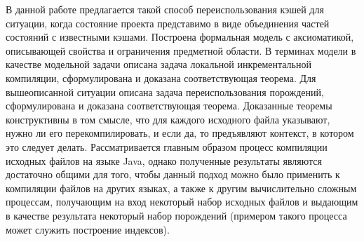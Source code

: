 В данной работе предлагается такой способ переиспользования кэшей для ситуации, когда состояние проекта представимо в виде объединения частей состояний с известными кэшами. Построена формальная модель с аксиоматикой, описывающей свойства и ограничения предметной области. В терминах модели в качестве модельной задачи описана задача локальной инкрементальной компиляции, сформулирована и доказана соответствующая теорема. Для вышеописанной ситуации описана задача переиспользования порождений, сформулирована и доказана соответствующая теорема. Доказанные теоремы конструктивны в том смысле, что для каждого исходного файла указывают, нужно ли его перекомпилировать, и если да, то предъявляют контекст, в котором это следует делать. Рассматривается главным образом процесс компиляции исходных файлов на языке Java, однако полученные результаты являются достаточно общими для того, чтобы данный подход можно было применить к компиляции файлов на других языках, а также к другим вычислительно сложным процессам, получающим на вход некоторый набор исходных файлов и выдающим в качестве результата некоторый набор порождений (примером такого процесса может служить построение индексов).